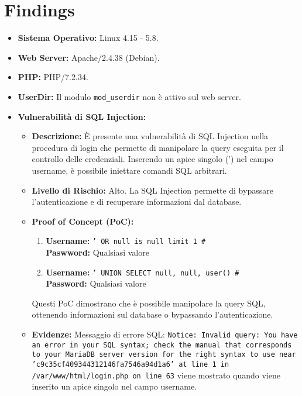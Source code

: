 \documentclass[12pt]{article}
\begin{document}
\section{Findings}
\begin{itemize}
    \item \textbf{Sistema Operativo:} Linux 4.15 - 5.8.
    \item \textbf{Web Server:} Apache/2.4.38 (Debian).
    \item \textbf{PHP:} PHP/7.2.34.
    \item \textbf{UserDir:} Il modulo \texttt{mod\_userdir} non \`{e} attivo sul 
    web server.
    \item \textbf{Vulnerabilit\`{a} di SQL Injection:}
    \begin{itemize}
        \item \textbf{Descrizione:} \`{E} presente una vulnerabilit\`{a} di SQL 
        Injection nella procedura di login che permette di manipolare la query 
        eseguita per il controllo delle credenziali. Inserendo un apice singolo 
        (') nel campo username, \`{e} possibile iniettare comandi SQL arbitrari.
        \item \textbf{Livello di Rischio:} Alto. La SQL Injection permette di 
        bypassare l'autenticazione e di recuperare informazioni dal database.
        \item \textbf{Proof of Concept (PoC):}
        \begin{enumerate}
            \item \textbf{Username:} \texttt{' OR null is null limit 1 \#}\\
            \textbf{Paswword:} Qualsiasi valore
            \item \textbf{Username:} \texttt{' UNION SELECT null, null, user() \#}\\
            \textbf{Password:} Qualsiasi valore
        \end{enumerate}
        Questi PoC dimostrano che \`{e} possibile manipolare la query SQL, ottenendo 
        informazioni sul database o bypassando l'autenticazione.
        \item \textbf{Evidenze:} Messaggio di errore SQL: \texttt{Notice: Invalid query: 
        You have an error in your SQL syntax; check the manual that corresponds 
        to your MariaDB server version for the right syntax to use near 
        'c9c35cf409344312146fa7546a94d1a6' at line 1 in /var/www/html/login.php 
        on line 63} viene mostrato quando viene inserito un apice singolo nel 
        campo username.

\end{itemize}
\end{itemize}
\end{document}

